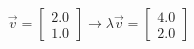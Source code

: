 \documentclass[preview]{standalone}
\begin{document}
\begin{align*}
\vec{v} = \begin{bmatrix} 2.0 \\ 1.0 \end{bmatrix}\rightarrow \lambda \vec{v} = \begin{bmatrix} 4.0 \\ 2.0 \end{bmatrix}
\end{align*}
\end{document}
